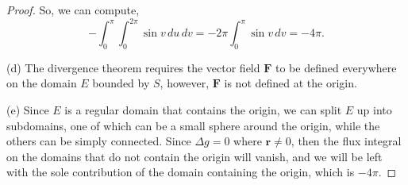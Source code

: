 \documentclass[../hw10]{subfiles}
\begin{document}
\begin{proof}
	So, we can compute, \[
		-\int_{0}^{\pi} \int_{0}^{2\pi } \sin{v} \,du \,dv = -2\pi \int_{0}^{\pi} \sin{v} \,dv = -4\pi
		.\]

	(d) The divergence theorem requires the vector field $\mathbf{F}$ to be defined everywhere on the domain $E$ bounded by $S$,
	however,  $\mathbf{F}$ is not defined at the origin.

	(e) Since $E$ is a regular domain that contains the origin, we can split  $E$ up into subdomains, one of which can be a small sphere around the origin, while the others can be simply connected.
	Since  $\Delta g = 0$ where  $\mathbf{r}\neq 0$, then the flux integral on the domains that do not contain the origin will vanish, and we will be left with the sole contribution of the domain containing the origin, which is $-4\pi$.
\end{proof}
\end{document}
